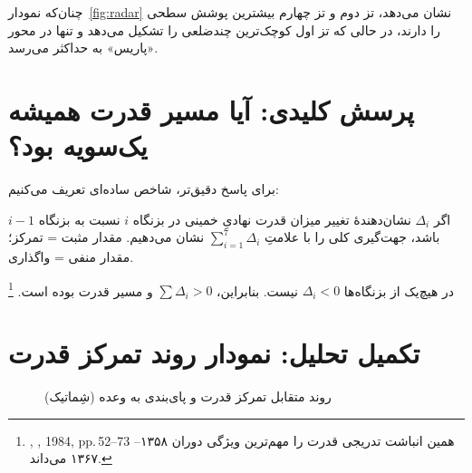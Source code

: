 چنان‌که نمودار~\ref{fig:radar} نشان می‌دهد،
\textcolor{cAccent}{تز دوم} و \textcolor{cConsolid}{تز چهارم}
بیشترین پوشش سطحی را دارند،
در حالی که \textcolor{cGreen}{تز اول} کوچک‌ترین چندضلعی
را تشکیل می‌دهد و تنها در محور «پاریس» به حداکثر می‌رسد.

\section{پرسش کلیدی: آیا مسیر قدرت همیشه یک‌سویه بود؟}
\label{sec:ch13-direction}

برای پاسخ دقیق‌تر، شاخص ساده‌ای تعریف می‌کنیم:

\begin{noteBox}
اگر $\Delta_i$ نشان‌دهندهٔ تغییر میزان قدرت نهادیِ خمینی
در بزنگاه $i$ نسبت به بزنگاه $i{-}1$ باشد،
جهت‌گیری کلی را با علامتِ $\sum_{i=1}^{7}\Delta_i$ نشان می‌دهیم.
مقدار مثبت = تمرکز؛ مقدار منفی = واگذاری.
\end{noteBox}

در هیچ‌یک از بزنگاه‌ها $\Delta_i < 0$ نیست.
بنابراین، $\sum \Delta_i > 0$ و مسیر قدرت
 بوده است.%
\footnote{%
,
\textit{}, 1984, pp.\,52–73
همین انباشت تدریجی قدرت را
مهم‌ترین ویژگی دوران ۱۳۵۸–۱۳۶۷ می‌داند.}

\section{تکمیل تحلیل: نمودار روند تمرکز قدرت}
\label{sec:ch13-trend}

\begin{figure}[ht]
\centering
{}
\caption{روند متقابل تمرکز قدرت و پای‌بندی به وعده (شِماتیک)}
\label{fig:trend-power}
\end{figure}

